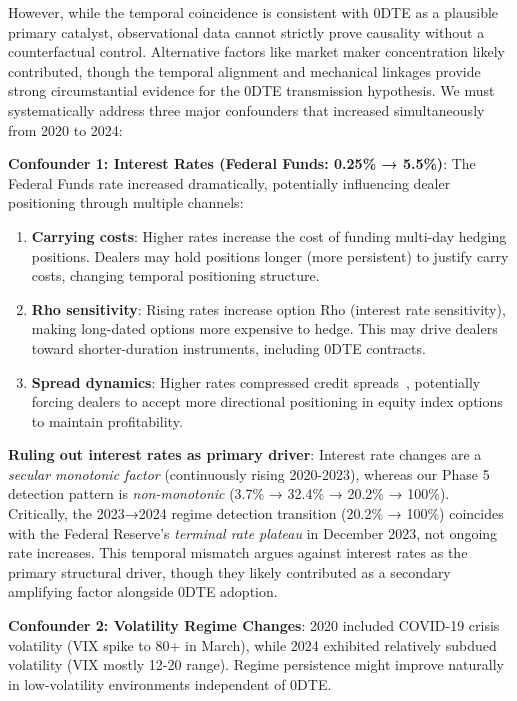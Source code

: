 However, while the temporal coincidence is consistent with 0DTE as a plausible primary catalyst, observational data cannot strictly prove causality without a counterfactual control. Alternative factors like market maker concentration likely contributed, though the temporal alignment and mechanical linkages provide strong circumstantial evidence for the 0DTE transmission hypothesis. We must systematically address three major confounders that increased simultaneously from 2020 to 2024:

\vspace{0.2cm}

\noindent\textbf{Confounder 1: Interest Rates (Federal Funds: 0.25\% → 5.5\%)}: The Federal Funds rate increased dramatically, potentially influencing dealer positioning through multiple channels:

\begin{enumerate}
\item \textbf{Carrying costs}: Higher rates increase the cost of funding multi-day hedging positions. Dealers may hold positions longer (more persistent) to justify carry costs, changing temporal positioning structure.
\item \textbf{Rho sensitivity}: Rising rates increase option Rho (interest rate sensitivity), making long-dated options more expensive to hedge. This may drive dealers toward shorter-duration instruments, including 0DTE contracts.
\item \textbf{Spread dynamics}: Higher rates compressed credit spreads~\citep{kolanovic2023volmageddon}, potentially forcing dealers to accept more directional positioning in equity index options to maintain profitability.
\end{enumerate}

\noindent\textbf{Ruling out interest rates as primary driver}: Interest rate changes are a \textit{secular monotonic factor} (continuously rising 2020-2023), whereas our Phase 5 detection pattern is \textit{non-monotonic} (3.7\% → 32.4\% → 20.2\% → 100\%). Critically, the 2023→2024 regime detection transition (20.2\% → 100\%) coincides with the Federal Reserve's \textit{terminal rate plateau} in December 2023, not ongoing rate increases. This temporal mismatch argues against interest rates as the primary structural driver, though they likely contributed as a secondary amplifying factor alongside 0DTE adoption.

\vspace{0.2cm}

\noindent\textbf{Confounder 2: Volatility Regime Changes}: 2020 included COVID-19 crisis volatility (VIX spike to 80+ in March), while 2024 exhibited relatively subdued volatility (VIX mostly 12-20 range). Regime persistence might improve naturally in low-volatility environments independent of 0DTE.

